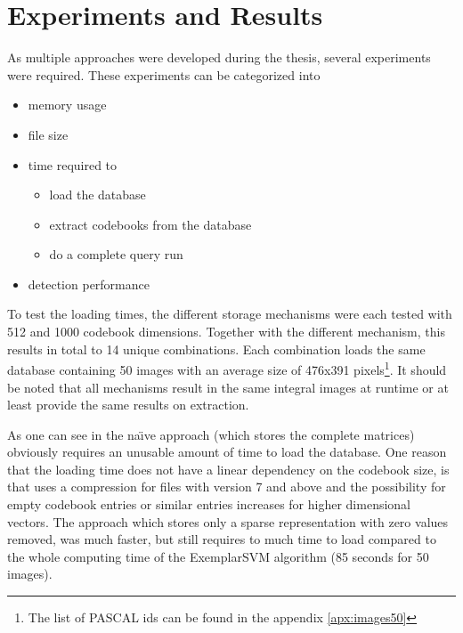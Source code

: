 \chapter{Experiments and Results}
\label{cha:experiments}

As multiple approaches were developed during the thesis, several experiments were required. These experiments can be categorized into 

\begin{itemize}
\item memory usage
\item file size
\item time required to
    \begin{itemize}
    \item load the database
    \item extract codebooks from the database
    \item do a complete query run
    \end{itemize}
\item detection performance
\end{itemize}

To test the loading times, the different storage mechanisms were each tested with 512 and 1000 codebook dimensions. Together with the different mechanism, this results in total to 14 unique combinations. Each combination loads the same database containing 50 images with an average size of 476x391 pixels\footnote{The list of PASCAL ids can be found in the appendix \ref{apx:images50}}. It should be noted that all mechanisms result in the same integral images at runtime or at least provide the same results on extraction.

As one can see in  the na\"{\i}ve approach (which stores the complete matrices) obviously requires an unusable amount of time to load the database. One reason that the loading time does not have a linear dependency on the codebook size, is that \MATLAB uses a compression for files with version 7 and above and the possibility for empty codebook entries or similar entries increases for higher dimensional vectors. The approach which stores only a sparse representation with zero values removed, was much faster, but still requires to much time to load compared to the whole computing time of the ExemplarSVM algorithm (85 seconds for 50 images).

